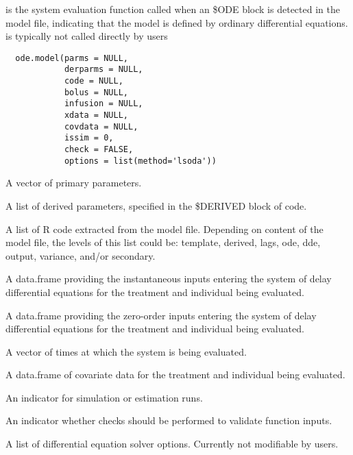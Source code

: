 %
\begin{Description}\relax
{} is the system evaluation function called when an \$ODE block
is detected in the model file, indicating that the model is defined by 
ordinary differential equations.  is typically not called 
directly by users
\end{Description}
%
\begin{Usage}
\begin{verbatim}
  ode.model(parms = NULL,
            derparms = NULL,
            code = NULL,
            bolus = NULL,
            infusion = NULL,
            xdata = NULL,
            covdata = NULL,
            issim = 0,
            check = FALSE,
            options = list(method='lsoda'))
\end{verbatim}
\end{Usage}
%
\begin{Arguments}
\begin{ldescription}
\item[\code{parms}] A vector of primary parameters.
\item[\code{derparms}] A list of derived parameters, specified in the \$DERIVED block
of code.
\item[\code{code}] A list of R code extracted from the model file. Depending on 
content of the model file, the levels of this list could be: template,
derived, lags, ode, dde, output, variance, and/or secondary.
\item[\code{bolus}] A data.frame providing the instantaneous inputs  entering the 
system of delay differential equations for the treatment and individual 
being evaluated.
\item[\code{infusion}] A data.frame providing the zero-order inputs entering the 
system of delay differential equations for the treatment and individual 
being evaluated.
\item[\code{xdata}] A vector of times at which the system is being evaluated.
\item[\code{covdata}] A data.frame of covariate data for the treatment and individual 
being evaluated.
\item[\code{issim}] An indicator for simulation or estimation runs.
\item[\code{check}] An indicator whether checks should be performed to validate 
function inputs.
\item[\code{options}] A list of differential equation solver options. Currently
not modifiable by users.
\end{ldescription}
\end{Arguments}
